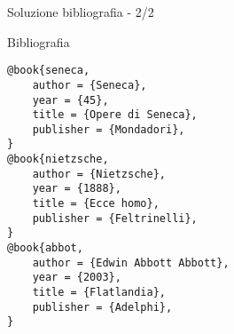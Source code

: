 \begin{frame}[fragile]{Soluzione bibliografia - 2/2}

\begin{block}{Bibliografia}

\begin{lstlisting}[basicstyle=\tiny]
@book{seneca,
    author = {Seneca},
    year = {45},
    title = {Opere di Seneca},
    publisher = {Mondadori},
}
@book{nietzsche,
    author = {Nietzsche},
    year = {1888},
    title = {Ecce homo},
    publisher = {Feltrinelli},
}
@book{abbot,
    author = {Edwin Abbott Abbott},
    year = {2003},
    title = {Flatlandia},
    publisher = {Adelphi},
}
\end{lstlisting}

\end{block}

\end{frame}
